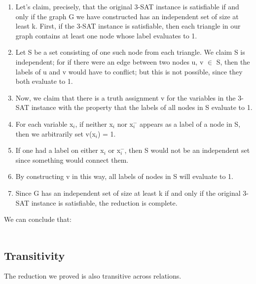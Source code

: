 \documentclass{article}
\begin{document}
\begin{enumerate}
    \item Let’s claim, precisely, that the original 3-SAT instance is satisfiable if and only if the graph G we have constructed has an independent set of size at least k. First, if the 3-SAT instance is satisfiable, then each triangle in our graph contains at least one node whose label evaluates to 1.
    \item Let S be a set consisting of one such node from each triangle. We claim S is independent; for if there were an edge between two nodes u, v $\in$ S, then the labels of u and v would have to conflict; but this is not possible, since they both evaluate to 1.
    \item Now, we claim that there is a truth assignment v for the variables in the 3-SAT instance with the property that the labels of all nodes in S evaluate to 1.
    \item For each variable x$_i$, if neither x$_i$ nor x$_{i}^{-}$ appears as a label of a node in S, then we arbitrarily set v(x$_i$) = 1.
    \item If one had a label on either x$_i$ or x$_{i}^{-}$, then S would not be an independent set since something would connect them.
    \item By constructing v in this way, all labels of nodes in S will evaluate to 1.
    \item Since G has an independent set of size at least k if and only if the original 3-SAT instance is satisfiable, the reduction is complete.
\end{enumerate}

We can conclude that:\\

\\

\subsection{Transitivity}
The reduction we proved is also transitive across relations.\\

\\
\end{document}
